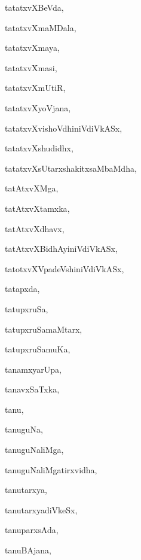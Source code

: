 \begin{multicols}{3}
{\noindent
{tatatxvXBeVda}, \pageref{tatatxvXBeVda}

\noindent
{tatatxvXmaMDala}, \pageref{tatatxvXmaMDala}

\noindent
{tatatxvXmaya}, \pageref{tatatxvXmaya}

\noindent
{tatatxvXmasi}, \pageref{tatatxvXmasi}

\noindent
{tatatxvXmUtiR}, \pageref{tatatxvXmUtiR}

\noindent
{tatatxvXyoVjana}, \pageref{tatatxvXyoVjana}

\noindent
{tatatxvXvishoVdhiniVdiVkASx}, \pageref{tatatxvXvishoVdhiniVdiVkASx}

\noindent
{tatatxvXshudidhx}, \pageref{tatatxvXshudidhx}

\noindent
{tatatxvXsUtarxshakitxsaMbaMdha}, \pageref{tatatxvXsUtarxshakitxsaMbaMdha}

\noindent
{tatAtxvXMga}, \pageref{tatAtxvXMga}

\noindent
{tatAtxvXtamxka}, \pageref{tatAtxvXtamxka}

\noindent
{tatAtxvXdhavx}, \pageref{tatAtxvXdhavx}

\noindent
{tatAtxvXBidhAyiniVdiVkASx}, \pageref{tatAtxvXBidhAyiniVdiVkASx}

\noindent
{tatotxvXVpadeVshiniVdiVkASx}, \pageref{tatotxvXVpadeVshiniVdiVkASx}

\noindent
{tatapxda}, \pageref{tatapxda}

\noindent
{tatupxruSa}, \pageref{tatupxruSa}

\noindent
{tatupxruSamaMtarx}, \pageref{tatupxruSamaMtarx}

\noindent
{tatupxruSamuKa}, \pageref{tatupxruSamuKa}

\noindent
{tanamxyarUpa}, \pageref{tanamxyarUpa}

\noindent
{tanavxSaTxka}, \pageref{tanavxSaTxka}

\noindent
{tanu}, \pageref{tanu}

\noindent
{tanuguNa}, \pageref{tanuguNa}

\noindent
{tanuguNaliMga}, \pageref{tanuguNaliMga}

\noindent
{tanuguNaliMgatirxvidha}, \pageref{tanuguNaliMgatirxvidha}

\noindent
{tanutarxya}, \pageref{tanutarxya}

\noindent
{tanutarxyadiVkeSx}, \pageref{tanutarxyadiVkeSx}

\noindent
{tanuparxsAda}, \pageref{tanuparxsAda}

\noindent
{tanuBAjana}, \pageref{tanuBAjana}

}
\end{multicols}
